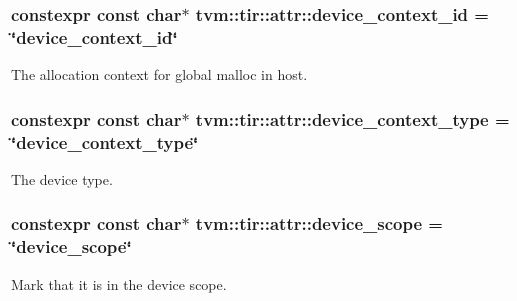 \subsubsection[{\texorpdfstring{device\+\_\+context\+\_\+id}{device_context_id}}]{\setlength{\rightskip}{0pt plus 5cm}constexpr const char$\ast$ tvm\+::tir\+::attr\+::device\+\_\+context\+\_\+id = \char`\"{}device\+\_\+context\+\_\+id\char`\"{}}\hypertarget{namespacetvm_1_1tir_1_1attr_a5f3aac4e433fcd6d93f8982540960263}{}\label{namespacetvm_1_1tir_1_1attr_a5f3aac4e433fcd6d93f8982540960263}


The allocation context for global malloc in host. 

\subsubsection[{\texorpdfstring{device\+\_\+context\+\_\+type}{device_context_type}}]{\setlength{\rightskip}{0pt plus 5cm}constexpr const char$\ast$ tvm\+::tir\+::attr\+::device\+\_\+context\+\_\+type = \char`\"{}device\+\_\+context\+\_\+type\char`\"{}}\hypertarget{namespacetvm_1_1tir_1_1attr_a9e64432b8b1b9323c5ad18957ba88b23}{}\label{namespacetvm_1_1tir_1_1attr_a9e64432b8b1b9323c5ad18957ba88b23}


The device type. 

\subsubsection[{\texorpdfstring{device\+\_\+scope}{device_scope}}]{\setlength{\rightskip}{0pt plus 5cm}constexpr const char$\ast$ tvm\+::tir\+::attr\+::device\+\_\+scope = \char`\"{}device\+\_\+scope\char`\"{}}\hypertarget{namespacetvm_1_1tir_1_1attr_a36db026f638ad3d951c302796ddcae24}{}\label{namespacetvm_1_1tir_1_1attr_a36db026f638ad3d951c302796ddcae24}


Mark that it is in the device scope. 

